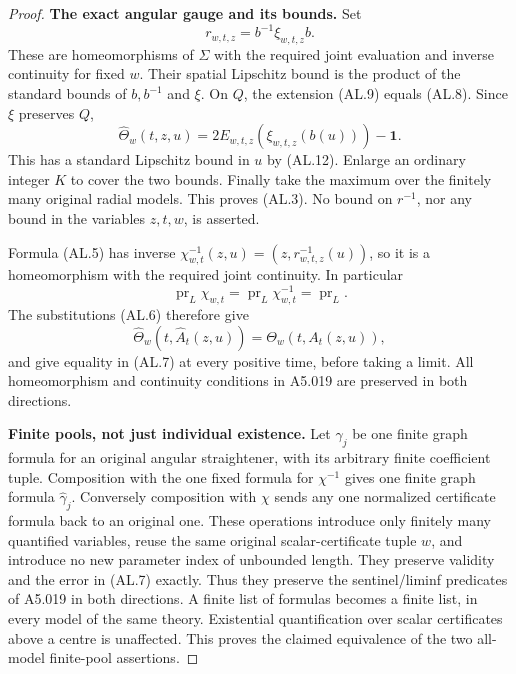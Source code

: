 \begin{proof}
\textbf{The exact angular gauge and its bounds.}\quad
Set
\[
 r_{w,t,z}=b^{-1}\xi_{w,t,z}b.
 \tag{AL.13}
\]
These are homeomorphisms of $\Sigma$ with the required joint evaluation
and inverse continuity for fixed $w$. Their spatial Lipschitz bound
is the product of the standard bounds of $b,b^{-1}$ and $\xi$.
On $Q$, the extension (AL.9) equals (AL.8). Since $\xi$ preserves $Q$,
\[
 \widehat\Theta_w(t,z,u)
       =2E_{w,t,z}(\xi_{w,t,z}(b(u)))-\mathbf1.
 \tag{AL.14}
\]
This has a standard Lipschitz bound in $u$ by (AL.12). Enlarge an
ordinary integer $K$ to cover the two bounds. Finally take the maximum
over the finitely many original radial models. This proves (AL.3).
No bound on $r^{-1}$, nor any bound in the variables $z,t,w$, is asserted.

Formula (AL.5) has inverse
$\chi_{w,t}^{-1}(z,u)=(z,r_{w,t,z}^{-1}(u))$, so it is a homeomorphism
with the required joint continuity. In particular
\[
 \operatorname{pr}_L\chi_{w,t}
 =\operatorname{pr}_L\chi_{w,t}^{-1}=\operatorname{pr}_L.
\]
The substitutions (AL.6) therefore give
\[
 \widehat\Theta_w(t,\widehat A_t(z,u))
   =\Theta_w(t,A_t(z,u)),
\]
and give equality in (AL.7) at every positive time, before taking a
limit. All homeomorphism and continuity conditions in A5.019 are
preserved in both directions.

\textbf{Finite pools, not just individual existence.}\quad
Let $\gamma_j$ be one finite graph formula for an original angular
straightener, with its arbitrary finite coefficient tuple. Composition
with the one fixed formula for $\chi^{-1}$ gives one finite graph formula
$\widehat\gamma_j$. Conversely composition with $\chi$ sends any one
normalized certificate formula back to an original one. These operations
introduce only finitely many quantified variables, reuse the same
original scalar-certificate tuple $w$, and introduce no new parameter
index of unbounded length. They preserve validity and the error in
(AL.7) exactly. Thus they preserve the sentinel/liminf predicates of
A5.019 in both directions. A finite list of formulas becomes a finite
list, in every model of the same theory. Existential quantification
over scalar certificates above a centre is unaffected. This proves the
claimed equivalence of the two all-model finite-pool assertions.
\end{proof}

